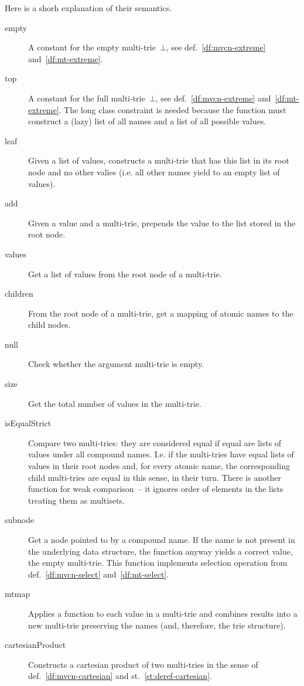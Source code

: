 \documentclass{article}
\theoremstyle{definition}
\begin{document}
Here is a shorh explanation of their semantics.
\begin{description}
\item [empty]
  A constant for the empty multi-trie~$\bot$, see def.~\ref{df:mvcn-extreme}
  and~\ref{df:mt-extreme}.
\item [top]
  A constant for the full multi-trie~$\bot$, see def.~\ref{df:mvcn-extreme}
  and~\ref{df:mt-extreme}.  The long class constraint is needed because the
  function must construct a (lazy) list of all names and a list of all possible
  values.
\item [leaf] Given a list of values, constructs a multi-trie that has this list
  in its root node and no other valies (i.e. all other names yield to an empty
  list of values).
\item [add]
  Given a value and a multi-trie, prepends the value to the list stored in the
  root node.
\item [values]
  Get a list of values from the root node of a multi-trie.
\item [children]
  From the root node of a multi-trie, get a mapping of atomic names to the
  child nodes.
\item [null]
  Check whether the argument multi-trie is empty.
\item [size]
  Get the total number of values in the multi-trie.
\item [isEqualStrict]
  Compare two multi-tries: they are considered equal if equal are lists of
  values under all compound names. I.e. if the multi-tries have equal lists
  of values in their root nodes and, for every atomic name, the corresponding
  child multi-tries are equal in this sense, in their turn. There is another
  function for weak comparison~-- it ignores order of elements in the lists
  treating them as multisets.
\item [subnode]
  Get a node pointed to by a compound name. If the name is not present in the
  underlying data structure, the function anyway yields a correct value, the
  empty multi-trie. This function implements selection operation from
  def.~\ref{df:mvcn-select} and~\ref{df:mt-select}.
\item [mtmap]
  Applies a function to each value in a multi-trie and combines results into
  a new multi-trie preserving the names (and, therefore, the trie structure).
\item [cartesianProduct]
  Constructs a cartesian product of two multi-tries in the sense of
  def.~\ref{df:mvcn-cartesian} and st.~\ref{st:deref-cartesian}.

\end{description}
\end{document}
